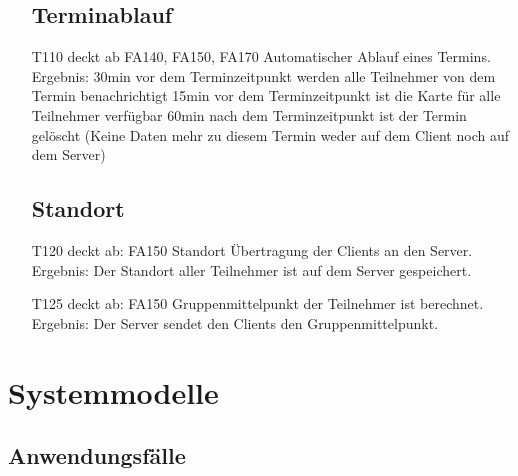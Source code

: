 \documentclass{scrartcl}
\begin{document}
\begin{itemize}
	\subsection{Terminablauf}
	
		\item[T110] deckt ab FA140, FA150, FA170 \newline
		Automatischer Ablauf eines Termins. \newline
		Ergebnis: 30min vor dem Terminzeitpunkt werden alle \gls{Teilnehmer} von dem Termin benachrichtigt  \newline
			15min vor dem Terminzeitpunkt ist die Karte für alle Teilnehmer verfügbar  \newline
			60min nach dem Terminzeitpunkt ist der Termin gelöscht (Keine Daten mehr zu diesem Termin weder auf 					dem \gls{Client} noch auf dem \gls{Server})

	\subsection{Standort}
		\item[T120] deckt ab: FA150 \newline
		Standort Übertragung der Clients an den \gls{Server}.  \newline
		Ergebnis: Der Standort aller \gls{Teilnehmer} ist auf dem Server gespeichert.

		\item[T125]  deckt ab: FA150 \newline
		Gruppenmittelpunkt der \gls{Teilnehmer} ist berechnet. \newline
		Ergebnis: Der \gls{Server} sendet den Clients den Gruppenmittelpunkt.

	\end{itemize}	
	
	\newpage
	
	
	\section{Systemmodelle}
	
	\subsection{Anwendungsfälle}
\end{document}
